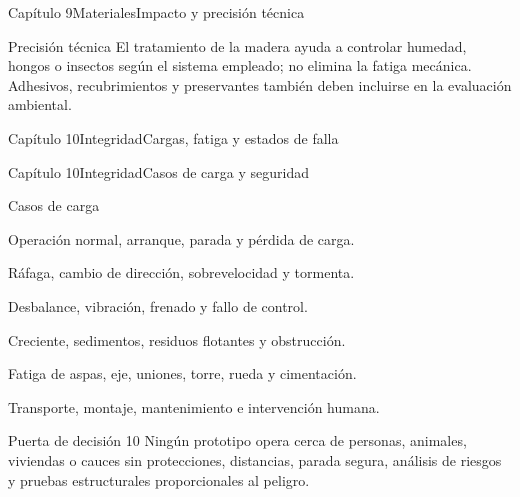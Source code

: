 \documentclass{../plantilla/hvtbook}
\begin{document}
\begin{HVTPage}{Capítulo 9}{Materiales}{Impacto y precisión técnica}
\begin{HVTWarning}{Precisión técnica}
El tratamiento de la madera ayuda a controlar humedad, hongos o insectos según el sistema empleado; no elimina la fatiga mecánica. Adhesivos, recubrimientos y preservantes también deben incluirse en la evaluación ambiental.
\end{HVTWarning}
\end{HVTPage}

\begin{HVTPage}{Capítulo 10}{Integridad}{Cargas, fatiga y estados de falla}
\end{HVTPage}

\begin{HVTPage}{Capítulo 10}{Integridad}{Casos de carga y seguridad}
\begin{HVTTask}{Casos de carga}
  \item Operación normal, arranque, parada y pérdida de carga.
  \item Ráfaga, cambio de dirección, sobrevelocidad y tormenta.
  \item Desbalance, vibración, frenado y fallo de control.
  \item Creciente, sedimentos, residuos flotantes y obstrucción.
  \item Fatiga de aspas, eje, uniones, torre, rueda y cimentación.
  \item Transporte, montaje, mantenimiento e intervención humana.
\end{HVTTask}
\begin{HVTWarning}{Puerta de decisión 10}
Ningún prototipo opera cerca de personas, animales, viviendas o cauces sin protecciones, distancias, parada segura, análisis de riesgos y pruebas estructurales proporcionales al peligro.
\end{HVTWarning}
\end{HVTPage}
\end{document}
